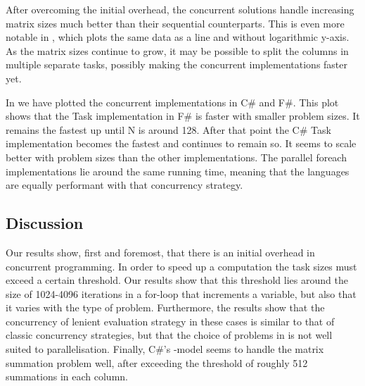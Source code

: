 After overcoming the initial overhead, the concurrent solutions handle increasing matrix sizes much better than their sequential counterparts. This is even more notable in , which plots the same data as a line and without logarithmic y-axis. As the matrix sizes continue to grow, it may be possible to split the columns in multiple separate tasks, possibly making the concurrent implementations faster yet.


In  we have plotted the concurrent implementations in C\# and F\#. This plot shows that the Task implementation in F\# is faster with smaller problem sizes. It remains the fastest up until N is around 128. After that point the C\# Task implementation becomes the fastest and continues to remain so. It seems to scale better with problem sizes than the other implementations. The parallel foreach implementations lie around the same running time, meaning that the languages are equally performant with that concurrency strategy.

\subsection{Discussion}\label{sec:crit-work-dis}
Our results show, first and foremost, that there is an initial overhead in concurrent programming. In order to speed up a computation the task sizes must exceed a certain threshold. Our results show that this threshold lies around the size of 1024-4096 iterations in a for-loop that increments a variable, but also that it varies with the type of problem. Furthermore, the results show that the concurrency of lenient evaluation strategy in these cases is similar to that of classic concurrency strategies, but that the choice of problems in \cite{DBLP:journals/cl/Tremblay-parallel} is not well suited to parallelisation. Finally, C\#'s -model seems to handle the matrix summation problem well, after exceeding the threshold of roughly 512 summations in each column.

